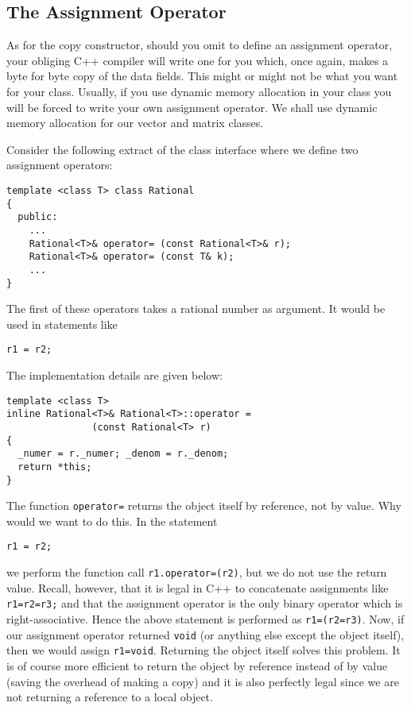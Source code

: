 
\subsection{The Assignment Operator}

As for the copy constructor, should you omit to define an assignment 
operator, your obliging C++ compiler will write one for you which, once 
again, makes a byte for byte copy of the data fields. This might or might 
not be what you want for your class. Usually, if you use dynamic memory
allocation in your class you will be forced to write your own assignment
operator. We shall use dynamic memory allocation for our vector and
matrix classes.

Consider the following extract of the class interface where we define
two assignment operators:
{\footnotesize \begin{verbatim}
template <class T> class Rational
{
  public:
    ...
    Rational<T>& operator= (const Rational<T>& r);
    Rational<T>& operator= (const T& k);
    ...
}
\end{verbatim}}
The first of these operators takes a rational number as argument.
It would be used in statements like
{\footnotesize \begin{verbatim}
r1 = r2;
\end{verbatim}}
\noindent
The implementation details are given below:
{\footnotesize \begin{verbatim}
template <class T>
inline Rational<T>& Rational<T>::operator =
               (const Rational<T> r)
{
  _numer = r._numer; _denom = r._denom;
  return *this;
}
\end{verbatim}}
\noindent
The function \verb+operator=+ returns
the object itself by reference, not by value. Why would we want to
do this. In the statement
{\footnotesize \begin{verbatim}
r1 = r2;
\end{verbatim}} 
we perform the function call \verb+r1.operator=(r2)+, but we do not
use the return value. Recall, however, that it is legal in C++ to
concatenate assignments like \verb+r1=r2=r3;+ and that
the assignment operator is the only binary operator which 
is right-associative. Hence the above statement is performed as
\verb+r1=(r2=r3)+. Now, if our assignment operator returned \verb+void+
(or anything else except the object itself), then we would assign
\verb+r1=void+. Returning the object itself solves this problem.
It is of course more efficient to return the object by reference
instead of by value (saving the overhead of making a copy)
and it is also perfectly legal since we are not returning a reference to
a local object.

